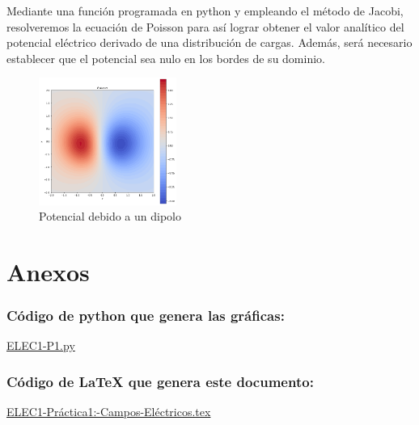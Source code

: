 \documentclass[11pt]{article}
\begin{document}
\vspace{5mm} Mediante una función programada en python y empleando el método de Jacobi, resolveremos la ecuación de Poisson para así lograr obtener el valor analítico del potencial eléctrico derivado de una distribución de cargas. Además, será necesario establecer que el potencial sea nulo en los bordes de su dominio.

\begin{figure}[h]
            \centering
            \includegraphics[width=0.4\textwidth]{poisson.png}
            \caption{Potencial debido a un dipolo}
        \end{figure}

\section{Anexos}
\subsubsection*{Código de python que genera las gráficas:}
\href{https://github.com/vmr48-ua/extras/blob/main/ELEC1-P1.py}{ELEC1-P1.py}
\subsubsection*{Código de LaTeX que genera este documento:}
\href{https://www.overleaf.com/read/bcpdkynrkkqs}{ELEC1-Práctica1:-Campos-Eléctricos.tex}
\end{document}
